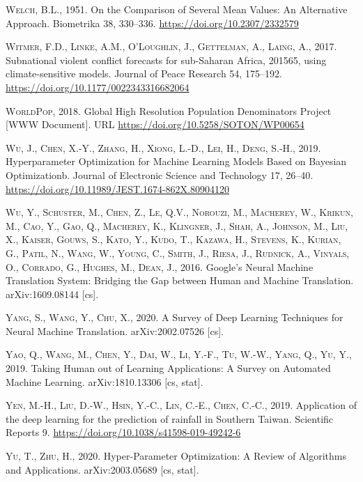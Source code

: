 \documentclass[a4paper,11pt]{article}
\begin{document}
\leavevmode\hypertarget{ref-welch1951}{}%
\textsc{Welch, B.L.}, 1951. On the Comparison of Several Mean Values: An Alternative Approach. Biometrika 38, 330--336. \url{https://doi.org/10.2307/2332579}

\leavevmode\hypertarget{ref-witmer2017}{}%
\textsc{Witmer, F.D., Linke, A.M., O'Loughlin, J., Gettelman, A., Laing, A.}, 2017. Subnational violent conflict forecasts for sub-Saharan Africa, 201565, using climate-sensitive models. Journal of Peace Research 54, 175--192. \url{https://doi.org/10.1177/0022343316682064}

\leavevmode\hypertarget{ref-worldpop2018}{}%
\textsc{WorldPop}, 2018. Global High Resolution Population Denominators Project {[}WWW Document{]}. URL \url{https://doi.org/10.5258/SOTON/WP00654}

\leavevmode\hypertarget{ref-wu2019}{}%
\textsc{Wu, J., Chen, X.-Y., Zhang, H., Xiong, L.-D., Lei, H., Deng, S.-H.}, 2019. Hyperparameter Optimization for Machine Learning Models Based on Bayesian Optimizationb. Journal of Electronic Science and Technology 17, 26--40. \url{https://doi.org/10.11989/JEST.1674-862X.80904120}

\leavevmode\hypertarget{ref-wu2016}{}%
\textsc{Wu, Y., Schuster, M., Chen, Z., Le, Q.V., Norouzi, M., Macherey, W., Krikun, M., Cao, Y., Gao, Q., Macherey, K., Klingner, J., Shah, A., Johnson, M., Liu, X., Kaiser, Gouws, S., Kato, Y., Kudo, T., Kazawa, H., Stevens, K., Kurian, G., Patil, N., Wang, W., Young, C., Smith, J., Riesa, J., Rudnick, A., Vinyals, O., Corrado, G., Hughes, M., Dean, J.}, 2016. Google's Neural Machine Translation System: Bridging the Gap between Human and Machine Translation. arXiv:1609.08144 {[}cs{]}.

\leavevmode\hypertarget{ref-yang2020}{}%
\textsc{Yang, S., Wang, Y., Chu, X.}, 2020. A Survey of Deep Learning Techniques for Neural Machine Translation. arXiv:2002.07526 {[}cs{]}.

\leavevmode\hypertarget{ref-yao2019a}{}%
\textsc{Yao, Q., Wang, M., Chen, Y., Dai, W., Li, Y.-F., Tu, W.-W., Yang, Q., Yu, Y.}, 2019. Taking Human out of Learning Applications: A Survey on Automated Machine Learning. arXiv:1810.13306 {[}cs, stat{]}.

\leavevmode\hypertarget{ref-yen2019}{}%
\textsc{Yen, M.-H., Liu, D.-W., Hsin, Y.-C., Lin, C.-E., Chen, C.-C.}, 2019. Application of the deep learning for the prediction of rainfall in Southern Taiwan. Scientific Reports 9. \url{https://doi.org/10.1038/s41598-019-49242-6}

\leavevmode\hypertarget{ref-yu2020}{}%
\textsc{Yu, T., Zhu, H.}, 2020. Hyper-Parameter Optimization: A Review of Algorithms and Applications. arXiv:2003.05689 {[}cs, stat{]}.
\end{document}
